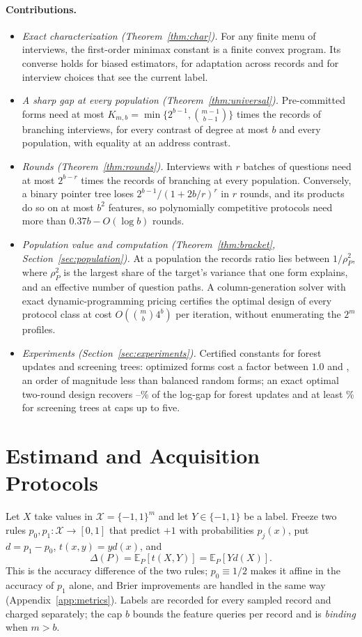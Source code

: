 \documentclass{article}
\newcommand{\E}{\mathbb{E}}
\newcommand{\X}{\mathcal X}
\begin{document}
\paragraph{Contributions.}
\begin{itemize}\itemsep1pt\parskip0pt
\item \emph{Exact characterization (Theorem~\ref{thm:char}).} For any finite menu of interviews, the first-order minimax constant is a finite convex program. Its converse holds for biased estimators, for adaptation across records and for interview choices that see the current label.
\item \emph{A sharp gap at every population (Theorem~\ref{thm:universal}).} Pre-committed forms need at most $K_{m,b}=\min\{2^{b-1},\binom{m-1}{b-1}\}$ times the records of branching interviews, for every contrast of degree at most $b$ and every population, with equality at an address contrast.
\item \emph{Rounds (Theorem~\ref{thm:rounds}).} Interviews with $r$ batches of questions need at most $2^{b-r}$ times the records of branching at every population. Conversely, a binary pointer tree loses $2^{b-1}/(1+2b/r)^r$ in $r$ rounds, and its products do so on at most $b^2$ features, so polynomially competitive protocols need more than $0.37b-O(\log b)$ rounds.
\item \emph{Population value and computation (Theorem~\ref{thm:bracket}, Section~\ref{sec:population}).} At a population the records ratio lies between $1/\rho_P^2$, where $\rho_P^2$ is the largest share of the target's variance that one form explains, and an effective number of question paths. A column-generation solver with exact dynamic-programming pricing certifies the optimal design of every protocol class at cost $O(\binom mb4^b)$ per iteration, without enumerating the $2^m$ profiles.
\item \emph{Experiments (Section~\ref{sec:experiments}).} Certified constants for forest updates and screening trees: optimized forms cost a factor between $1.0$ and \nMaxAll, an order of magnitude less than balanced random forms; an exact optimal two-round design recovers \nTwoForestLo--\nTwoForestHi\% of the log-gap for forest updates and at least \nScreenTwoRecMin\% for screening trees at caps up to five.
\end{itemize}

\section{Estimand and Acquisition Protocols}\label{sec:setup}
Let $X$ take values in $\X=\{-1,1\}^m$ and let $Y\in\{-1,1\}$ be a label. Freeze two rules $p_0,p_1:\X\to[0,1]$ that predict $+1$ with probabilities $p_j(x)$, put $d=p_1-p_0$, $t(x,y)=yd(x)$, and
\begin{equation}
 \Delta(P)=\E_P[t(X,Y)]=\E_P[Yd(X)].\label{eq:gain}
\end{equation}
This is the accuracy difference of the two rules; $p_0\equiv1/2$ makes it affine in the accuracy of $p_1$ alone, and Brier improvements are handled in the same way (Appendix~\ref{app:metrics}). Labels are recorded for every sampled record and charged separately; the cap $b$ bounds the feature queries per record and is \emph{binding} when $m>b$.
\end{document}

